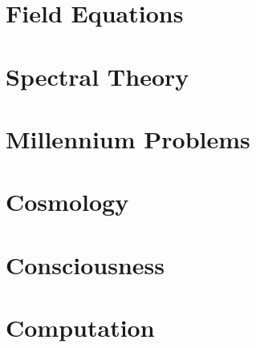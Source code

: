 \documentclass[11pt,letterpaper,openany]{book}
\begin{document}
\part{Field Equations}









\part{Spectral Theory}





\part{Millennium Problems}







\part{Cosmology}





\part{Consciousness}




\part{Computation}



\end{document}
